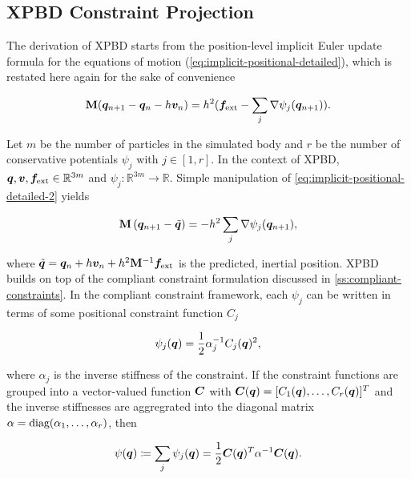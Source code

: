 \subsection{XPBD Constraint Projection}\label{ss:xpbd-constraint-projection}
The derivation of XPBD \cite{macklin2016} starts from the position-level implicit Euler update formula for the equations of motion 
(\cref{eq:implicit-positional-detailed}), which is restated here again for the sake of convenience

\begin{equation}\label{eq:implicit-positional-detailed-2}
    \mathbf{M}(\bm{q}_{n+1} - \bm{q}_n - h\bm{v}_n) = h^2(\bm{f_\text{ext}} - \sum_j \nabla \psi_j(\bm{q}_{n+1})).
\end{equation}

\noindent Let $m$ be the number of particles in the simulated body and $r$ be the number of conservative potentials $\psi_j$ with $j \in [1, r]$.
In the context of XPBD, $\bm{q}, \bm{v}, \bm{f}_{\text{ext}} \in \mathbb{R}^{3m}$ and $\psi_j \colon \mathbb{R}^{3m} \to \mathbb{R}$. Simple 
manipulation of \autoref{eq:implicit-positional-detailed-2} yields

\begin{equation}\label{eq:implicit-positional-detailed-3}
    \mathbf{M} \left( \bm{q}_{n+1} - \tilde{\bm{q}} \right) = - h^2 \sum_j \nabla \psi_j(\bm{q}_{n+1}),
\end{equation}

\noindent where $\tilde{\bm{q}} = \bm{q}_n + h\bm{v}_n + h^2 \mathbf{M}^{-1} \bm{f}_{\text{ext}}$ is the predicted, inertial position. XPBD builds on
top of the compliant constraint formulation discussed in \cref{ss:compliant-constraints}. In the compliant constraint framework, each $\psi_j$ 
can be written in terms of some positional constraint function $C_j$ 

\begin{equation}\label{eq:xpbd-potential-j}
    \psi_j(\bm{q}) = \frac{1}{2} \alpha^{-1}_j C_j(\bm{q})^2,
\end{equation}

\noindent where $\alpha_j$ is the inverse stiffness of the constraint. If the constraint functions are grouped into a vector-valued function
$\bm{C}$ with $\bm{C}(\bm{q}) = [C_1(\bm{q}), \ldots, C_r(\bm{q})]^T$ and the inverse stiffnesses are aggregrated into the diagonal matrix
$\mathbf{\alpha} = \text{diag}(\alpha_1, \ldots, \alpha_r)$, then

\begin{equation}\label{eq:xpbd-potential}
    \psi(\bm{q}) \coloneqq \sum_j \psi_j(\bm{q}) = \frac{1}{2}\bm{C}(\bm{q})^T \mathbf{\alpha}^{-1} \bm{C}(\bm{q}).
\end{equation}

